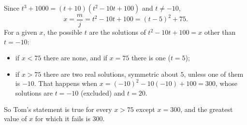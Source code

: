 Since $t^3+1000=(t+10)(t^2-10t+100)$ and $t\ne-10$,
\[x=\dfrac {m}{j}=t^2-10t+100=(t-5)^2+75.\]
For a given $x$, the possible $t$ are the solutions of $t^2-10t+100=x$ other than $t=-10$:
\begin{itemize}
\item if $x<75$ there are none, and if $x=75$ there is one ($t=5$);
\item if $x>75$ there are two real solutions, symmetric about $5$, unless one of them is $-10$. That happens when $x=(-10)^2-10(-10)+100=300$, whose solutions are $t=-10$ (excluded) and $t=20$.
\end{itemize}
So Tom's statement is true for every $x>75$ except $x=300$, and the greatest value of $x$ for which it fails is $\boxed{300}$.
